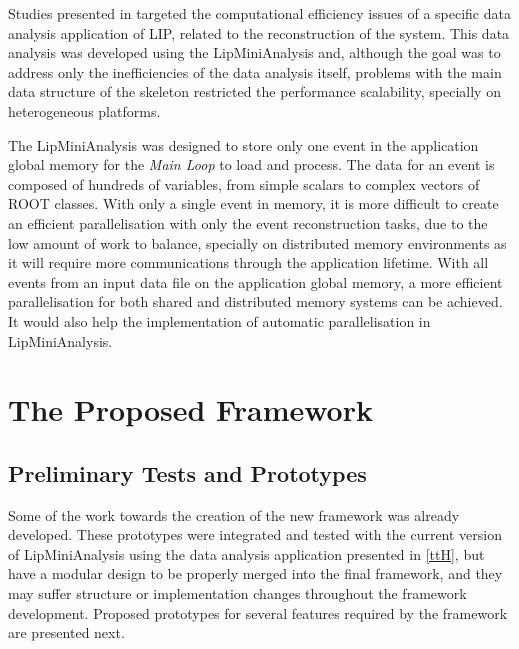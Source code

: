 Studies presented in \cite{Msc:AMP,paperAMP} targeted the computational efficiency issues of a specific data analysis application of LIP, related to the reconstruction of the \ttH system. This data analysis was developed using the LipMiniAnalysis and, although the goal was to address only the inefficiencies of the data analysis itself, problems with the main data structure of the skeleton restricted the performance scalability, specially on heterogeneous platforms.

The LipMiniAnalysis was designed to store only one event in the application global memory for the \textit{Main Loop} to load and process. The data for an event is composed of hundreds of variables, from simple scalars to complex vectors of ROOT classes. With only a single event in memory, it is more difficult to create an efficient parallelisation with only the event reconstruction tasks, due to the low amount of work to balance, specially on distributed memory environments as it will require more communications through the application lifetime. With all events from an input data file on the application global memory, a more efficient parallelisation for both shared and distributed memory systems can be achieved. It would also help the implementation of automatic parallelisation in LipMiniAnalysis.

\section{The Proposed Framework}
\label{new_framework}

\subsection{Preliminary Tests and Prototypes}
\label{work_so_far}

Some of the work towards the creation of the new framework was already developed. These prototypes were integrated and tested with the current version of LipMiniAnalysis using the \ttH data analysis application presented in \ref{ttH}, but have a modular design to be properly merged into the final framework, and they may suffer structure or implementation changes throughout the framework development. Proposed prototypes for several features required by the framework are presented next.

